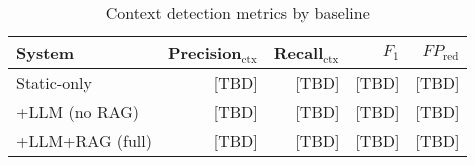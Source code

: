 \begin{table}[htbp]
	\centering
		\caption{Context detection metrics by baseline}\label{tab:context-metrics}
	\begin{tabular}{lrrrr}
		\hline
		System & Precision$_{\text{ctx}}$ & Recall$_{\text{ctx}}$ & $F_1$ & $FP_{\text{red}}$ \\
		\hline
		Static-only & [TBD] & [TBD] & [TBD] & [TBD] \\
		+LLM (no RAG) & [TBD] & [TBD] & [TBD] & [TBD] \\
		+LLM+RAG (full) & [TBD] & [TBD] & [TBD] & [TBD] \\
		\hline
	\end{tabular}
\end{table}





